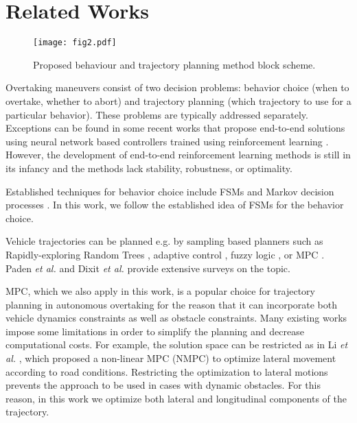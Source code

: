 \documentclass[letterpaper, 10 pt, conference]{ieeeconf}
\begin{document}
\section{Related Works}

\begin{figure}[!t]
    \texttt{[image: fig2.pdf]}
    \centering
    \caption{Proposed behaviour and trajectory planning method block scheme.}   
    \label{proposed_control_architecture}
\end{figure}

Overtaking maneuvers consist of two decision problems: behavior choice (when to overtake, whether to abort) and trajectory planning (which trajectory to use for a particular behavior). 
These problems are typically addressed separately.
Exceptions can be found in some recent works that propose end-to-end solutions using neural network based controllers trained using reinforcement learning \cite{liqiu2020,yuluyang2020,liuPredictiveFreewayOvertaking2019}. 
However, the development of end-to-end reinforcement learning methods is still in its infancy and the methods lack stability, robustness, or optimality.

Established techniques for behavior choice include FSMs \cite{buehlerDARPAUrbanChallenge2009a} and Markov decision processes \cite{brechtelProbabilisticDecisionmakingUncertainty2014a}. 
In this work, we follow the established idea of FSMs for the behavior choice.

Vehicle trajectories can be planned e.g. by sampling based planners such as Rapidly-exploring Random Trees \cite{khaksarApplicationSamplingBasedMotion2016}, adaptive control \cite{petrov2014}, fuzzy logic \cite{armagan2020}, or MPC \cite{molinariEfficientMixedInteger2017}.
Paden \textit{et al.} \cite{padenSurveyMotionPlanning2016} and  Dixit \textit{et al.} \cite{dixitTrajectoryPlanningAutonomous2018a} provide extensive surveys on the topic. 

MPC, which we also apply in this work, is a popular choice for trajectory planning in autonomous overtaking for the reason that it can incorporate both vehicle dynamics constraints as well as obstacle constraints.
Many existing works impose some limitations in order to simplify the planning and decrease computational costs.
For example, the solution space can be restricted as in Li \textit{et al.} \cite{liDynamicTrajectoryPlanning2019}, which proposed a non-linear MPC (NMPC) to optimize lateral movement according to road conditions. 
Restricting the optimization to lateral motions prevents the approach to be used in cases with dynamic obstacles. For this reason, in this work we optimize both lateral and longitudinal components of the trajectory.
\end{document}
